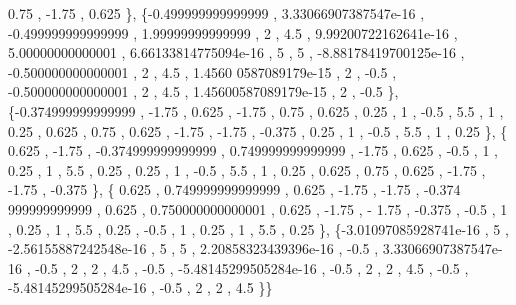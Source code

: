 \begin{DoxyCode}
           0.75 ,             -1.75 ,             0.625 \},
\{-0.499999999999999 , 3.33066907387547e-16 , -0.499999999999999 ,  1.99999999999999 ,                 2 ,  
                   4.5 , 9.99200722162641e-16 ,  5.00000000000001 , 6.66133814775094e-16 ,                 5 ,    
                   5 , -8.88178419700125e-16 , -0.500000000000001 ,                 2 ,               4.5 , 1.4560
      0587089179e-15 ,                 2 ,              -0.5 , -0.500000000000001 ,                 2 ,           
          4.5 , 1.45600587089179e-15 ,                 2 ,              -0.5 \},
\{-0.374999999999999 ,             -1.75 ,             0.625 ,             -1.75 ,              0.75 ,      
             0.625 ,              0.25 ,                 1 ,              -0.5 ,               5.5 ,              
         1 ,              0.25 ,             0.625 ,              0.75 ,             0.625 ,             -1.75 ,  
                 -1.75 ,            -0.375 ,              0.25 ,                 1 ,              -0.5 ,          
           5.5 ,                 1 ,              0.25 \},
\{            0.625 ,             -1.75 , -0.374999999999999 , 0.749999999999999 ,             -1.75 ,      
             0.625 ,              -0.5 ,                 1 ,              0.25 ,                 1 ,              
       5.5 ,              0.25 ,              0.25 ,                 1 ,              -0.5 ,               5.5 ,  
                     1 ,              0.25 ,             0.625 ,              0.75 ,             0.625 ,          
         -1.75 ,             -1.75 ,            -0.375 \},
\{            0.625 , 0.749999999999999 ,             0.625 ,             -1.75 ,             -1.75 , -0.374
      999999999999 ,             0.625 , 0.750000000000001 ,             0.625 ,             -1.75 ,             -
      1.75 ,            -0.375 ,              -0.5 ,                 1 ,              0.25 ,                 1 ,  
                   5.5 ,              0.25 ,              -0.5 ,                 1 ,              0.25 ,          
             1 ,               5.5 ,              0.25 \},
\{-3.01097085928741e-16 ,                 5 , -2.56155887242548e-16 ,                 5 ,                 5 
      , 2.20858323439396e-16 ,              -0.5 , 3.33066907387547e-16 ,              -0.5 ,                 2 , 
                      2 ,               4.5 ,              -0.5 , -5.48145299505284e-16 ,              -0.5 ,     
                  2 ,                 2 ,               4.5 ,              -0.5 , -5.48145299505284e-16 ,         
           -0.5 ,                 2 ,                 2 ,               4.5 \}\}
\end{DoxyCode}
\mbox{\label{a00482_ad0e413c816dfa121d92ed67c43d35071}} 
